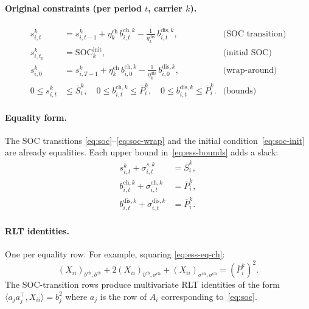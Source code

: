\documentclass[11pt]{article}
\theoremstyle{definition}
\newcommand{\inner}[2]{\langle #1, #2 \rangle}
\begin{document}
\paragraph{Original constraints (per period $t$, carrier $k$).}
\begin{align}
s^{k}_{i,t}&=s^{k}_{i,t-1}+\eta^{\mathrm{ch}}_k\,b^{\mathrm{ch},k}_{i,t}
  -\tfrac{1}{\eta^{\mathrm{dis}}_k}\,b^{\mathrm{dis},k}_{i,t},
  &\text{(SOC transition)}\label{eq:soc}\\
s^{k}_{i,t_0}&=\mathrm{SOC}^{\mathrm{init}}_k,
  &\text{(initial SOC)}\label{eq:soc-init}\\
s^{k}_{i,0}&=s^{k}_{i,T-1}+\eta^{\mathrm{ch}}_k\,b^{\mathrm{ch},k}_{i,0}
  -\tfrac{1}{\eta^{\mathrm{dis}}_k}\,b^{\mathrm{dis},k}_{i,0},
  &\text{(wrap-around)}\label{eq:soc-wrap}\\
0\le s^{k}_{i,t}&\le\overline{S}^{k}_i,\quad
0\le b^{\mathrm{ch},k}_{i,t}\le\overline{P}^{k}_i,\quad
0\le b^{\mathrm{dis},k}_{i,t}\le\overline{P}^{k}_i.
  &\text{(bounds)}\label{eq:ess-bounds}
\end{align}

\paragraph{Equality form.}
The SOC transitions \eqref{eq:soc}--\eqref{eq:soc-wrap} and the initial
condition~\eqref{eq:soc-init} are already equalities.  Each upper bound
in~\eqref{eq:ess-bounds} adds a slack:
\begin{align}
s^{k}_{i,t}+\sigma^{s,k}_{i,t}&=\overline{S}^{k}_i,\label{eq:ess-eq-s}\\
b^{\mathrm{ch},k}_{i,t}+\sigma^{\mathrm{ch},k}_{i,t}&=\overline{P}^{k}_i,
\label{eq:ess-eq-ch}\\
b^{\mathrm{dis},k}_{i,t}+\sigma^{\mathrm{dis},k}_{i,t}&=\overline{P}^{k}_i.
\label{eq:ess-eq-dis}
\end{align}

\paragraph{RLT identities.}
One per equality row.  For example, squaring
\eqref{eq:ess-eq-ch}:
\begin{equation}
(X_{ii})_{b^{\mathrm{ch}},b^{\mathrm{ch}}}
+2(X_{ii})_{b^{\mathrm{ch}},\sigma^{\mathrm{ch}}}
+(X_{ii})_{\sigma^{\mathrm{ch}},\sigma^{\mathrm{ch}}}
=(\overline{P}^{k}_i)^{2}.
\label{eq:ess-rlt-ch}
\end{equation}
The SOC-transition rows produce multivariate RLT identities of the form
$\inner{a_ja_j^{\top}}{X_{ii}}=b_j^{2}$ where $a_j$ is the row of
$A_i$ corresponding to~\eqref{eq:soc}.
\end{document}
